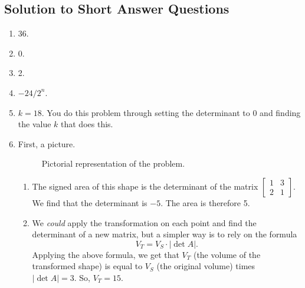 \subsection{Solution to Short Answer Questions}
\begin{enumerate}
	\item 36.
	\item 0.
	\item 2.
	\item \(-24/2^n\).
	\item \(k = 18\). You do this problem through setting the determinant to 0 and finding the value \(k\) that does this.
	\item First, a picture.
		\begin{figure}[!h]
			\centering
			\caption{Pictorial representation of the problem.}
		\end{figure}
		\begin{enumerate}
			\item The signed area of this shape is the determinant of the matrix \(\begin{bmatrix}1 & 3 \\ 2 & 1\end{bmatrix}\). We find that the
			 	 determinant is \(-5\). The area is therefore 5.
			\item We \emph{could} apply the transformation on each point and find the determinant of a new matrix, but a simpler way is to rely on the formula
				\[V_T = V_S \cdot \lvert \det A \rvert.\]
				Applying the above formula, we get that \(V_T\) (the volume of the transformed shape) is equal to \(V_S\) (the original volume) times
				\(\lvert \det A \rvert = 3.\) So, \(V_T = 15\).
		\end{enumerate}
\end{enumerate}
